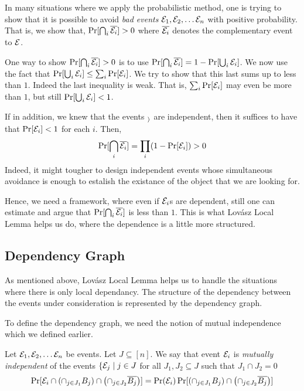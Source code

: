 In many situations where we apply the probabilistic method, one is trying to show that it is possible to avoid {\em bad events} 
${\cal E}_1, {\cal E}_2, \ldots {\cal E}_n$ with positive probability. That is, we show that, $\Pr[\bigcap_{i} \overline{{\cal E}_i}] > 0$ where $\overline{{\cal E}_i}$ denotes the complementary event to ${\cal E}$.

One way to show $\Pr[\bigcap_{i} \overline{{\cal E}_i}] > 0$ is to use $\Pr[\bigcap_{i}\overline{{\cal E}_i}] = 1-\Pr[\bigcup_{i}{\cal E}_i]$.
We now use the fact that $\Pr[\bigcup_i {\cal E}_i] \le \sum_i \Pr[{\cal E}_i]$. We try to show that this last sums up to less than $1$. Indeed the last inequality is weak. That is, $\sum_i \Pr[{\cal E}_i]$ may even be more than $1$, but still $\Pr[\bigcup_i {\cal E}_i] < 1$.

If in addition, we knew that the events $\cal_i$ are independent, then it suffices to have that $\Pr[{\cal E}_i] < 1$ for each $i$. Then, $$\Pr[\bigcap_{i} \overline{{\cal E}_i}] = \prod_i (1-\Pr[{\cal E}_i]) > 0$$
Indeed, it might tougher to design independent events whose simultaneous avoidance is enough to estalish the existance of the object that we are looking for.

Hence, we need a framework, where even if ${\cal E}_i$s are dependent, still one can estimate and argue that $\Pr[\bigcap_{i} \overline{{\cal E}_i}]$ is less than $1$. This is what Lov\'asz Local Lemma helps us do, where the dependence is a little more structured.

\subsection{Dependency Graph}

As mentioned above, Lov\'asz Local Lemma helps us to handle the situations where there is only local dependancy. The structure of the dependency between the events under consideration is represented by the dependency graph.

To define the dependency graph, we need the notion of mutual independence which we defined earlier.

\begin{definition}
Let ${\cal E}_1, {\cal E}_2, \ldots {\cal E}_n$ be events. Let $J \subseteq [n]$. We say that event ${\cal E}_i$ is \textit{mutually independent} of the events $\{{\cal E}_j \mid j \in J$ for all $J_1, J_2 \subseteq J$
such that $J_1 \cap J_2 = 0$
$$\Pr [ {\cal E}_i \cap \left( \cap_{j \in J_1} B_j \right) \cap \left( \cap_{j \in J_2} \overline{B_j} \right) ] = \Pr({\cal E}_i) \Pr[\left( \cap_{j \in J_1} B_j \right) \cap \left( \cap_{j \in J_2} \overline{B_j} \right) ] $$
\end{definition}

